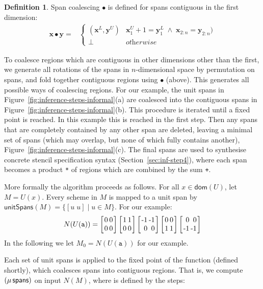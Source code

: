 \documentclass[9pt,preprint]{sigplanconf}
\newcounter{block}
\theoremstyle{definition}
\newtheorem{definition}[block]{Definition}
\newcommand{\vect}[1]{\textbf{#1}}
\newcommand{\vtwo}[2]{\setlength{\arraycolsep}{0em}
\left[\begin{array}{l}#1\\#2\end{array}\right]}
\newcommand{\stwo}[4]
{\setlength{\arraycolsep}{0.1em}
\left[\begin{array}{rr}$#1$ & $#3$\\$#2$ & $#4$\end{array}\right]}
\begin{document}
\begin{definition}\label{def:span-coalesc} Span
  coalescing $\bullet$ is defined for spans contiguous in the first dimension:
\begin{align*}
\vect{x} \bullet \vect{y}
= &
\begin{cases}
(\vect{x}^L, \vect{y}^U) & \vect{x}^U_1 + 1 = \vect{y}^L_1 \; \wedge \;
\vect{x}_{2:n} = \vect{y}_{2:n}) \\
\bot  & \textit{otherwise}
\end{cases}
\end{align*}
\end{definition}
\noindent
To coalesce regions which are contiguous in other dimensions
other than the first, we generate all rotations of the spans in
$n$-dimensional space by permutation on spans, and fold together contiguous
regions using $\bullet$ (above). This 
generates all possible ways of coalescing regions. For our example,
the unit spans in Figure~\ref{fig:inference-steps-informal}(a)
are coalesced into the contiguous spans in
Figure~\ref{fig:inference-steps-informal}(b).
This procedure is iterated until a fixed point is reached. In this
example this is reached in the first step. 
 Then any spans that are completely contained by any other span are deleted,
leaving a minimal set of spans (which may overlap, but none of which
fully contains another), Figure~\ref{fig:inference-steps-informal}(c).
The final spans are used to synthesise concrete stencil specification
syntax (Section~\ref{sec:inf-step4}), where
each span becomes a product \texttt{*} of regions which are 
combined by the sum \texttt{+}.

More formally the algorithm proceeds as follows.
For all $x \in \mathsf{dom}(U)$, let $M = U(x)$. Every scheme in $M$ 
is mapped to a unit span
by $\textsf{unitSpans}(M) = \{[u \; u] \mid u\!\in\!M\}$. For our example:
\begin{align*}
N(U(\texttt{a})) = \stwo{0}{0}{0}{0} \stwo{1}{0}{1}{0} \stwo{-1}{0}{-1}{0} \stwo{0}{1}{0}{1} \stwo{0}{-1}{0}{-1}
\end{align*}
In the following we let $M_0 = N(U(\texttt{a}))$ for our example.

Each set of unit spans is applied to the fixed point of the \spanOp{} function
(defined shortly), which coalesces spans into contiguous regions. That is, we compute
 $(\mu \, \textsf{spans})$ on input $N(M)$, where \spanOp{} is defined by the steps:
\end{document}
